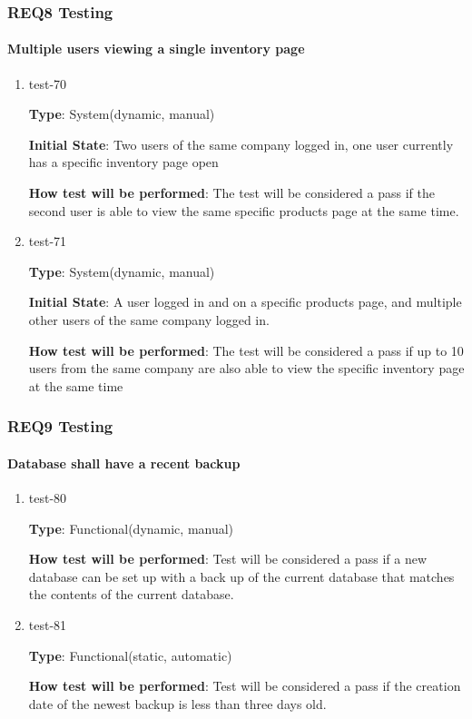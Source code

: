 \documentclass[12pt, titlepage]{article}
\begin{document}
\subsubsection{REQ8 Testing}
		
\paragraph{Multiple users viewing a single inventory page}

\begin{enumerate}
\item{test-70\\}

\textbf{Type}: System(dynamic, manual)
					
\textbf{Initial State}: Two users of the same company logged in, one user currently has a specific inventory page open
					
\textbf{How test will be performed}: The test will be considered a pass if the second user is able to view the same specific products page at the same time.
					
\item{test-71\\}

\textbf{Type}: System(dynamic, manual)
					
\textbf{Initial State}: A user logged in and on a specific products page, and multiple other users of the same company logged in.
					
\textbf{How test will be performed}: The test will be considered a pass if up to 10 users from the same company are also able to view the specific inventory page at the same time

\end{enumerate}

\subsubsection{REQ9 Testing}
		
\paragraph{Database shall have a recent backup}

\begin{enumerate}
\item{test-80\\}

\textbf{Type}: Functional(dynamic, manual)

\textbf{How test will be performed}: Test will be considered a pass if a new database can be set up with a back up of the current database that matches the contents of the current database.

\item{test-81\\}

\textbf{Type}: Functional(static, automatic)

\textbf{How test will be performed}: Test will be considered a pass if the creation date of the newest backup is less than three days old.

\end{enumerate}
\end{document}
